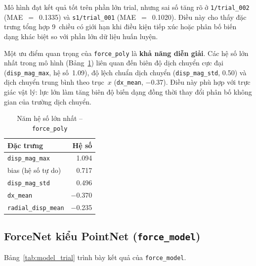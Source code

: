 Mô hình đạt kết quả tốt trên phần lớn trial, nhưng sai số tăng rõ ở
\texttt{1/trial\_002} (MAE~$=$~0.1335) và \texttt{s1/trial\_001}
(MAE~$=$~0.1020). Điều này cho thấy đặc trưng tổng hợp 9~chiều có giới hạn
khi điều kiện tiếp xúc hoặc phân bố biến dạng khác biệt so với phần lớn dữ
liệu huấn luyện.

Một ưu điểm quan trọng của \texttt{force\_poly} là \textbf{khả năng diễn
giải}. Các hệ số lớn nhất trong mô hình (Bảng~\ref{tab:coeff}) liên quan đến
biên độ dịch chuyển cực đại (\texttt{disp\_mag\_max}, hệ số~1.09), độ lệch
chuẩn dịch chuyển (\texttt{disp\_mag\_std}, 0.50) và dịch chuyển trung bình
theo trục~$x$ (\texttt{dx\_mean}, $-$0.37). Điều này phù hợp với trực giác
vật lý: lực lớn làm tăng biên độ biến dạng đồng thời thay đổi phân bố không
gian của trường dịch chuyển.

\begin{table}[h]
\centering
\caption{Năm hệ số lớn nhất -- \texttt{force\_poly}}
\label{tab:coeff}
\begin{tabular}{lr}
\toprule
\textbf{Đặc trưng} & \textbf{Hệ số} \\
\midrule
\texttt{disp\_mag\_max}           &  1.094 \\
bias (hệ số tự do)               &  0.717 \\
\texttt{disp\_mag\_std}           &  0.496 \\
\texttt{dx\_mean}                 & $-$0.370 \\
\texttt{radial\_disp\_mean}       & $-$0.235 \\
\bottomrule
\end{tabular}
\end{table}

\subsection{ForceNet kiểu PointNet (\texttt{force\_model})}

Bảng~\ref{tab:model_trial} trình bày kết quả của \texttt{force\_model}.

